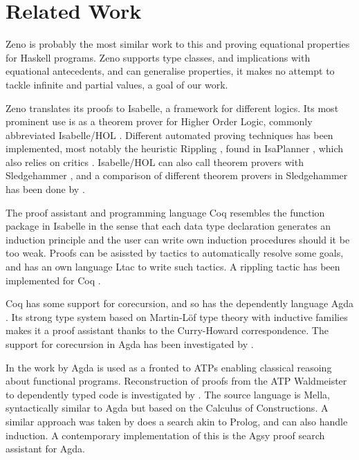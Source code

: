 \section{Related Work}

Zeno \citep{zeno} is probably the most similar work to this and
proving equational properties for Haskell programs. Zeno supports type
classes, and implications with equational antecedents, and can
generalise properties, it makes no attempt to tackle infinite and
partial values, a goal of our work.


Zeno translates its proofs to Isabelle, a framework for different
logics. Its most prominent use is as a theorem prover for Higher Order
Logic, commonly abbreviated Isabelle/HOL \citep{isabelbook}. Different
automated proving techniques has been implemented, most notably the
heuristic Rippling \citep{dixonphd}, found in IsaPlanner
\citep{isaplanner}, which also relies on critics
\citep{productiveuse}. Isabelle/HOL can also call theorem provers with
Sledgehammer \citep{hammering}, and a comparison of different theorem
provers in Sledgehammer has been done by \cite{judgement}.

The proof assistant and programming language Coq resembles the
function package in Isabelle in the sense that each data type
declaration generates an induction principle and the user can write
own induction procedures should it be too weak. Proofs can be asissted
by tactics to automatically resolve some goals, and has an own
language Ltac to write such tactics. A rippling tactic has been
implemented for Coq \citep{inductioncoq}.

Coq has some support for corecursion, and so has the dependently
language Agda \citep{norell:thesis}. Its strong type system based on
Martin-Löf type theory \citep{mltt} with inductive families makes it a
proof assistant thanks to the Curry-Howard correspondence. The
support for corecursion in Agda has been investigated by \cite{productivity}.

In the work by \cite{agdaatp} Agda is used as a fronted to ATPs
enabling classical reasoing about functional programs.  Reconstruction
of proofs from the ATP Waldmeister to dependently typed code is
investigated by \cite{dtatp}. The source language is Mella,
syntactically similar to Agda but based on the Calculus of
Constructions. A similar approach was taken by \cite{agsy} does a
search akin to Prolog, and can also handle induction. A contemporary
implementation of this is the Agsy proof search assistant for Agda.


